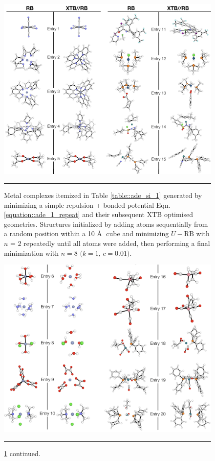 \documentclass[../../main.tex]{subfiles}
\begin{document}
\begin{figure}[h!]
	\vspace{0.4cm}
	\centering
	\includegraphics[width=\textwidth]{5/autode/figs/figS5a}
	\vspace{0.4cm}
	\hrule
	\caption{Metal complexes itemized in Table \ref{table::ade_si_1} generated by minimizing a simple repulsion + bonded potential Eqn. \eqref{equation::ade_1_repeat} and their subsequent XTB optimised geometries. Structures initialized by adding atoms sequentially from a random position within a 10 \AA$\;$ cube and minimizing $U-\text{RB}$ with $n$ = 2 repeatedly until all atoms were added, then performing a final minimization with $n = 8$ $(k = 1$, $c = 0.01)$.}
	\label{fig::ade_si_5a}
\end{figure}


\begin{figure}[h!]
	\vspace{0.4cm}
	\centering
	\includegraphics[width=\textwidth]{5/autode/figs/figS5b}
	\vspace{0.4cm}
	\hrule
	\caption{\figurename{ }\ref{fig::ade_si_5a} continued.}
	\label{fig::ade_si_5b}
\end{figure}
\end{document}
